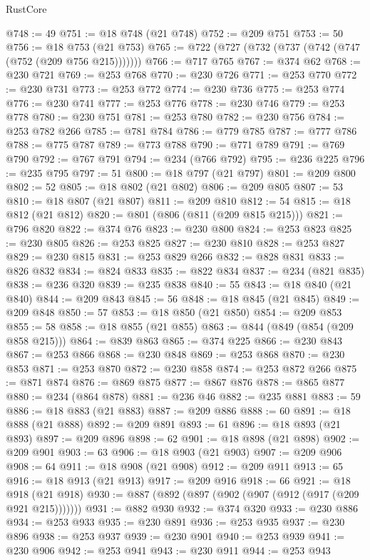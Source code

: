 \begin{lexlean}{RustCore}
\begin{coremodule}
@748 := 49
@751 := @18 @748 (@21 @748)
@752 := @209 @751
@753 := 50
@756 := @18 @753 (@21 @753)
@765 := @722 (@727 (@732 (@737 (@742 (@747 (@752 (@209 @756 @215)))))))
@766 := @717 @765
@767 := @374 @62
@768 := @230 @721
@769 := @253 @768
@770 := @230 @726
@771 := @253 @770
@772 := @230 @731
@773 := @253 @772
@774 := @230 @736
@775 := @253 @774
@776 := @230 @741
@777 := @253 @776
@778 := @230 @746
@779 := @253 @778
@780 := @230 @751
@781 := @253 @780
@782 := @230 @756
@784 := @253 @782 @266
@785 := @781 @784
@786 := @779 @785
@787 := @777 @786
@788 := @775 @787
@789 := @773 @788
@790 := @771 @789
@791 := @769 @790
@792 := @767 @791
@794 := @234 (@766 @792)
@795 := @236 @225
@796 := @235 @795
@797 := 51
@800 := @18 @797 (@21 @797)
@801 := @209 @800
@802 := 52
@805 := @18 @802 (@21 @802)
@806 := @209 @805
@807 := 53
@810 := @18 @807 (@21 @807)
@811 := @209 @810
@812 := 54
@815 := @18 @812 (@21 @812)
@820 := @801 (@806 (@811 (@209 @815 @215)))
@821 := @796 @820
@822 := @374 @76
@823 := @230 @800
@824 := @253 @823
@825 := @230 @805
@826 := @253 @825
@827 := @230 @810
@828 := @253 @827
@829 := @230 @815
@831 := @253 @829 @266
@832 := @828 @831
@833 := @826 @832
@834 := @824 @833
@835 := @822 @834
@837 := @234 (@821 @835)
@838 := @236 @320
@839 := @235 @838
@840 := 55
@843 := @18 @840 (@21 @840)
@844 := @209 @843
@845 := 56
@848 := @18 @845 (@21 @845)
@849 := @209 @848
@850 := 57
@853 := @18 @850 (@21 @850)
@854 := @209 @853
@855 := 58
@858 := @18 @855 (@21 @855)
@863 := @844 (@849 (@854 (@209 @858 @215)))
@864 := @839 @863
@865 := @374 @225
@866 := @230 @843
@867 := @253 @866
@868 := @230 @848
@869 := @253 @868
@870 := @230 @853
@871 := @253 @870
@872 := @230 @858
@874 := @253 @872 @266
@875 := @871 @874
@876 := @869 @875
@877 := @867 @876
@878 := @865 @877
@880 := @234 (@864 @878)
@881 := @236 @46
@882 := @235 @881
@883 := 59
@886 := @18 @883 (@21 @883)
@887 := @209 @886
@888 := 60
@891 := @18 @888 (@21 @888)
@892 := @209 @891
@893 := 61
@896 := @18 @893 (@21 @893)
@897 := @209 @896
@898 := 62
@901 := @18 @898 (@21 @898)
@902 := @209 @901
@903 := 63
@906 := @18 @903 (@21 @903)
@907 := @209 @906
@908 := 64
@911 := @18 @908 (@21 @908)
@912 := @209 @911
@913 := 65
@916 := @18 @913 (@21 @913)
@917 := @209 @916
@918 := 66
@921 := @18 @918 (@21 @918)
@930 := @887 (@892 (@897 (@902 (@907 (@912 (@917 (@209 @921 @215)))))))
@931 := @882 @930
@932 := @374 @320
@933 := @230 @886
@934 := @253 @933
@935 := @230 @891
@936 := @253 @935
@937 := @230 @896
@938 := @253 @937
@939 := @230 @901
@940 := @253 @939
@941 := @230 @906
@942 := @253 @941
@943 := @230 @911
@944 := @253 @943

\end{coremodule}
\end{lexlean}

